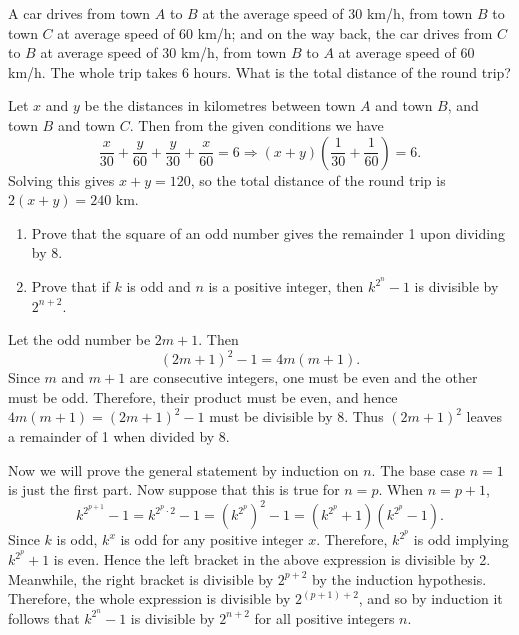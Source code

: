 \begin{question}
    A car drives from town $A$ to $B$ at the average speed of 30 km/h, from
    town $B$ to town $C$ at average speed of 60 km/h; and on the way back, the
    car drives from $C$ to $B$ at average speed of 30 km/h, from town $B$ to
    $A$ at average speed of 60 km/h. The whole trip takes 6 hours. What is the
    total distance of the round trip?
\end{question}
\begin{solution}
    Let $x$ and $y$ be the distances in kilometres between town $A$ and town
    $B$, and town $B$ and town $C$. Then from the given conditions we have
    \[ \frac{x}{30} + \frac{y}{60} + \frac{y}{30} + \frac{x}{60} = 6
    \Longrightarrow (x + y)\left( \frac{1}{30} + \frac{1}{60} \right) = 6. \]
    Solving this gives $x + y = 120$, so the total distance of the round trip
    is $2(x + y) = 240 \text{ km}$. 
\end{solution}

\begin{question}
    \begin{enumerate}
        \item Prove that the square of an odd number gives the remainder 1 upon
            dividing by 8. 
        
        \item Prove that if $k$ is odd and $n$ is a positive integer, then
            $k^{2^n} - 1$ is divisible by $2^{n + 2}$. 
    \end{enumerate}
\end{question}
\begin{solution}
    Let the odd number be $2m + 1$. Then 
    \[ (2m + 1)^2 - 1 = 4m(m + 1). \]
    Since $m$ and $m + 1$ are consecutive integers, one must be even and the
    other must be odd. Therefore, their product must be even, and hence $4m(m +
    1) = (2m + 1)^2 - 1$ must be divisible by 8. Thus $(2m + 1)^2$ leaves a
    remainder of 1 when divided by 8.

    Now we will prove the general statement by induction on $n$. The base case
    $n = 1$ is just the first part. Now suppose that this is true for $n = p$.
    When $n = p + 1$,
    \[ k^{2^{p + 1}} - 1 = k^{2^p \cdot 2} - 1 = (k^{2^p})^2 - 1 = (k^{2^p} +
    1)(k^{2^p} - 1). \]
    Since $k$ is odd, $k^x$ is odd for any positive integer $x$. Therefore,
    $k^{2^p}$ is odd implying $k^{2^p} + 1$ is even. Hence the left bracket in
    the above expression is divisible by 2. Meanwhile, the right bracket is
    divisible by $2^{p + 2}$ by the induction hypothesis. Therefore, the whole
    expression is divisible by $2^{(p + 1) + 2}$, and so by induction it
    follows that $k^{2^n} - 1$ is divisible by $2^{n + 2}$ for all positive
    integers $n$.
\end{solution}
